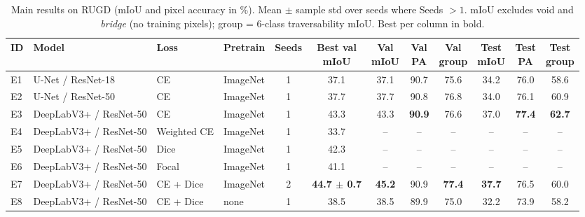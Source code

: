 \begin{table}[t]
\centering
\small
\caption{Main results on RUGD (mIoU and pixel accuracy in \%). Mean $\pm$ sample std over seeds where Seeds $>1$. mIoU excludes void and \emph{bridge} (no training pixels); group = 6-class traversability mIoU. Best per column in bold.}
\label{tab:main_results}
\begin{tabular}{llllcccccccc}
\toprule
ID & Model & Loss & Pretrain & Seeds & \shortstack{Best val\\mIoU} & \shortstack{Val\\mIoU} & \shortstack{Val\\PA} & \shortstack{Val\\group} & \shortstack{Test\\mIoU} & \shortstack{Test\\PA} & \shortstack{Test\\group} \\
\midrule
E1 & U-Net / ResNet-18 & CE & ImageNet & 1 & 37.1 & 37.1 & 90.7 & 75.6 & 34.2 & 76.0 & 58.6 \\
E2 & U-Net / ResNet-50 & CE & ImageNet & 1 & 37.7 & 37.7 & 90.8 & 76.8 & 34.0 & 76.1 & 60.9 \\
E3 & DeepLabV3+ / ResNet-50 & CE & ImageNet & 1 & 43.3 & 43.3 & \textbf{90.9} & 76.6 & 37.0 & \textbf{77.4} & \textbf{62.7} \\
E4 & DeepLabV3+ / ResNet-50 & Weighted CE & ImageNet & 1 & 33.7 & -- & -- & -- & -- & -- & -- \\
E5 & DeepLabV3+ / ResNet-50 & Dice & ImageNet & 1 & 42.3 & -- & -- & -- & -- & -- & -- \\
E6 & DeepLabV3+ / ResNet-50 & Focal & ImageNet & 1 & 41.1 & -- & -- & -- & -- & -- & -- \\
E7 & DeepLabV3+ / ResNet-50 & CE + Dice & ImageNet & 2 & \textbf{44.7 $\pm$ 0.7} & \textbf{45.2} & 90.9 & \textbf{77.4} & \textbf{37.7} & 76.5 & 60.0 \\
E8 & DeepLabV3+ / ResNet-50 & CE + Dice & none & 1 & 38.5 & 38.5 & 89.9 & 75.0 & 32.2 & 73.9 & 58.2 \\
\bottomrule
\end{tabular}
\end{table}

